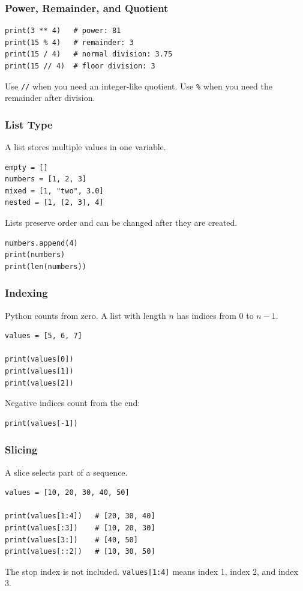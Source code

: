 \documentclass{beamer}
\begin{document}
	\begin{frame}[fragile]
		\frametitle{Power, Remainder, and Quotient}

		\begin{lstlisting}
print(3 ** 4)   # power: 81
print(15 % 4)   # remainder: 3
print(15 / 4)   # normal division: 3.75
print(15 // 4)  # floor division: 3
		\end{lstlisting}

		Use \texttt{//} when you need an integer-like quotient. Use \texttt{\%}
		when you need the remainder after division.
	\end{frame}

	\begin{frame}[fragile]
		\frametitle{List Type}

		A list stores multiple values in one variable.
		\begin{lstlisting}
empty = []
numbers = [1, 2, 3]
mixed = [1, "two", 3.0]
nested = [1, [2, 3], 4]
		\end{lstlisting}

		Lists preserve order and can be changed after they are created.
		\begin{lstlisting}
numbers.append(4)
print(numbers)
print(len(numbers))
		\end{lstlisting}
	\end{frame}

	\begin{frame}[fragile]
		\frametitle{Indexing}

		Python counts from zero. A list with length $n$ has indices from
		$0$ to $n-1$.
		\begin{lstlisting}
values = [5, 6, 7]

print(values[0])
print(values[1])
print(values[2])
		\end{lstlisting}

		Negative indices count from the end:
		\begin{lstlisting}
print(values[-1])
		\end{lstlisting}
	\end{frame}

	\begin{frame}[fragile]
		\frametitle{Slicing}

		A slice selects part of a sequence.
		\begin{lstlisting}
values = [10, 20, 30, 40, 50]

print(values[1:4])   # [20, 30, 40]
print(values[:3])    # [10, 20, 30]
print(values[3:])    # [40, 50]
print(values[::2])   # [10, 30, 50]
		\end{lstlisting}

		The stop index is not included. \texttt{values[1:4]} means index 1,
		index 2, and index 3.
	\end{frame}
\end{document}
